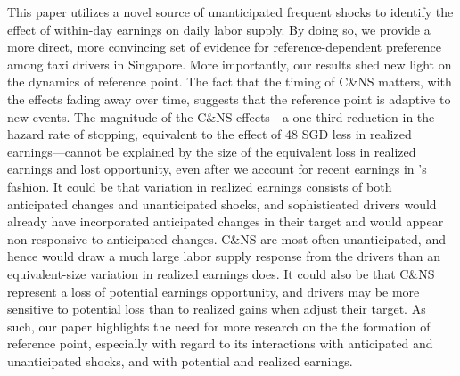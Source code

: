 \documentclass[reviewmode,AEJ]{AEA}
\begin{document}
This paper utilizes a novel source of unanticipated frequent shocks to identify the effect of within-day 
earnings on daily labor supply. By doing so, we provide a more direct, more convincing set of evidence for 
reference-dependent preference among taxi drivers in Singapore. More importantly, our results shed new light 
on the dynamics of reference point. The fact that the timing of C\&NS matters, with the effects fading away
over time, suggests that the reference point is adaptive to new events. The magnitude of the C\&NS effects---a
one third reduction in the hazard rate of stopping, equivalent to the effect of 48 SGD less in realized 
earnings---cannot be explained by the size of the equivalent loss in realized earnings and lost opportunity, 
even after we account for recent earnings in \citet{thakral2018daily}'s fashion. It could be that variation 
in realized earnings consists of both anticipated changes and unanticipated shocks, and sophisticated drivers 
would already have incorporated anticipated changes in their target and would appear non-responsive to
anticipated changes. C\&NS are most often unanticipated, and hence would draw a much large labor supply 
response from the drivers than an equivalent-size variation in realized earnings does. It could also be
that C\&NS represent a loss of potential earnings opportunity, and drivers may be more sensitive to potential
loss than to realized gains when adjust their target. As such, our paper highlights the need for more research
on the the formation of reference point, especially with regard to its interactions with anticipated and
unanticipated shocks, and with potential and realized earnings.
\end{document}
